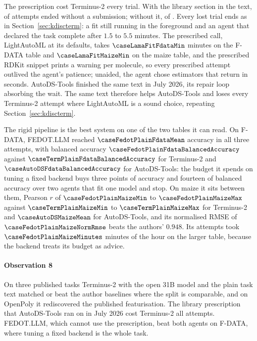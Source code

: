 The prescription cost Terminus-2 every trial. With the library section in the
text, \caseTermPrescLost{} of \caseTermPrescTotal{} attempts ended without a
submission; without it, \caseTermPlainLost{} of \caseTermPlainTotal{}. Every
lost trial ends as in Section~\ref{sec:kdiscterm}: a fit still running in the
foreground and an agent that declared the task complete after $1.5$ to $5.5$
minutes. The prescribed call, LightAutoML at its defaults, takes
$\caseLamaFitFdataMin$ minutes on the F-DATA table and $\caseLamaFitMaizeMin$
on the maize table, and the prescribed RDKit snippet prints a warning per
molecule, so every prescribed attempt outlived the agent's patience; unaided,
the agent chose estimators that return in seconds. AutoDS-Tools finished the
same text in July 2026, its repair loop absorbing the wait. The same text
therefore helps AutoDS-Tools and loses every Terminus-2 attempt where
LightAutoML is a sound choice, repeating Section~\ref{sec:kdiscterm}.

The rigid pipeline is the best system on one of the two tables it can read.
On F-DATA, FEDOT.LLM reached $\caseFedotPlainFdataMean$ accuracy in all three
attempts, with balanced accuracy $\caseFedotPlainFdataBalancedAccuracy$
against $\caseTermPlainFdataBalancedAccuracy$ for Terminus-2 and
$\caseAutoDSFdataBalancedAccuracy$ for AutoDS-Tools: the budget it spends on
tuning a fixed backend buys three points of accuracy and fourteen of balanced
accuracy over two agents that fit one model and stop. On maize it sits between
them, Pearson $r$ of $\caseFedotPlainMaizeMin$ to $\caseFedotPlainMaizeMax$
against $\caseTermPlainMaizeMin$ to $\caseTermPlainMaizeMax$ for Terminus-2
and $\caseAutoDSMaizeMean$ for AutoDS-Tools, and its normalised RMSE of
$\caseFedotPlainMaizeNormRmse$ beats the authors' $0.948$. Its attempts took
$\caseFedotPlainMaizeMinutes$ minutes of the hour on the larger table, because
the backend treats its budget as advice.

\paragraph{Observation 8} On three published tasks Terminus-2 with the open 31B
model and the plain task text matched or beat the author baselines where the split is comparable, and on
OpenPoly it rediscovered the published featurisation. The library prescription
that AutoDS-Tools ran on in July 2026 cost Terminus-2 all \caseTermPrescTotal{}
attempts. FEDOT.LLM, which cannot use the prescription, beat both agents on
F-DATA, where tuning a fixed backend is the whole task.
